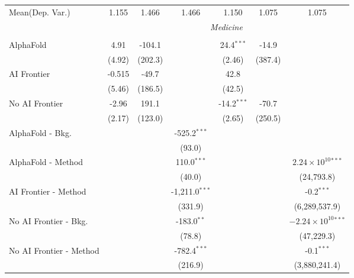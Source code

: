 \begin{tabular}{lcccccc}
Mean(Dep. Var.) & 1.155 & 1.466 & 1.466 & 1.150 & 1.075 & 1.075 \\
 & \multicolumn{6}{c}{\textit{Medicine}} \\ \\
   AlphaFold               & 4.91   & -104.1  &                  & 24.4$^{***}$  & -14.9   &   \\   
                           & (4.92) & (202.3) &                  & (2.46)        & (387.4) &   \\   
   AI Frontier             & -0.515 & -49.7   &                  & 42.8          &         &   \\   
                           & (5.46) & (186.5) &                  & (42.5)        &         &   \\   
   No AI Frontier          & -2.96  & 191.1   &                  & -14.2$^{***}$ & -70.7   &   \\   
                           & (2.17) & (123.0) &                  & (2.65)        & (250.5) &   \\   
   AlphaFold - Bkg.        &        &         & -525.2$^{***}$   &               &         &   \\   
                           &        &         & (93.0)           &               &         &   \\   
   AlphaFold - Method      &        &         & 110.0$^{***}$    &               &         & $2.24\times 10^{10}$$^{***}$\\    
                           &        &         & (40.0)           &               &         & (24,793.8)\\   
   AI Frontier - Method    &        &         & -1,211.0$^{***}$ &               &         & -0.2$^{***}$\\   
                           &        &         & (331.9)          &               &         & (6,289,537.9)\\   
   No AI Frontier - Bkg.   &        &         & -183.0$^{**}$    &               &         & $-2.24\times 10^{10}$$^{***}$\\    
                           &        &         & (78.8)           &               &         & (47,229.3)\\   
   No AI Frontier - Method &        &         & -782.4$^{***}$   &               &         & -0.1$^{***}$\\   
                           &        &         & (216.9)          &               &         & (3,880,241.4)\\   

\end{tabular}

